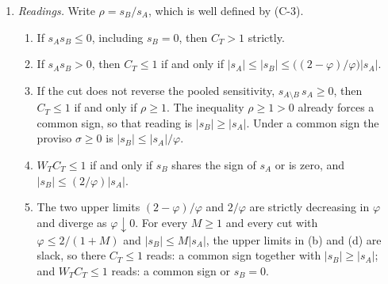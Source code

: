 \begin{corollary}
\begin{enumerate}[label=(\roman*),leftmargin=2.4em,itemsep=3pt]
\begin{equation}
\begin{aligned}
  W_T C_T \le 1 \quad&\Longleftrightarrow\quad
  s_B\bigl(2s_A-\varphi s_B\bigr) \ge 0 ,
  \end{aligned}
  \end{equation}
  that is, if and only if $s_B$ lies weakly between $0$ and $(2/\varphi)s_A$.
\item \emph{Readings.} Write $\rho = s_B/s_A$, which is well defined by (C-3).
  \begin{enumerate}[label=(\alph*),leftmargin=2.2em,itemsep=2pt]
  \item If $s_A s_B \le 0$, including $s_B = 0$, then $C_T > 1$ strictly.
  \item If $s_A s_B > 0$, then
    $C_T \le 1$ if and only if
    $|s_A| \le |s_B| \le \bigl((2-\varphi)/\varphi\bigr)|s_A|$.
  \item If the cut does not reverse the pooled sensitivity, $s_{A\setminus B}\,s_A \ge 0$, then
    $C_T \le 1$ if and only if $\rho \ge 1$. The inequality $\rho \ge 1 > 0$ already forces a
    common sign, so that reading is $|s_B| \ge |s_A|$. Under a common sign the proviso
    $\sigma \ge 0$ is $|s_B| \le |s_A|/\varphi$.
  \item $W_T C_T \le 1$ if and only if $s_B$ shares the sign of $s_A$ or is zero, and
    $|s_B| \le (2/\varphi)|s_A|$.
  \item The two upper limits $(2-\varphi)/\varphi$ and $2/\varphi$ are strictly decreasing in
    $\varphi$ and diverge as $\varphi\downarrow0$. For every $M \ge 1$ and every cut with
    $\varphi \le 2/(1+M)$ and $|s_B| \le M|s_A|$, the upper limits in (b) and (d) are slack, so
    there $C_T \le 1$ reads: a common sign together with $|s_B| \ge |s_A|$; and $W_T C_T \le 1$
    reads: a common sign or $s_B = 0$.
  \end{enumerate}
\end{enumerate}
\end{corollary}

